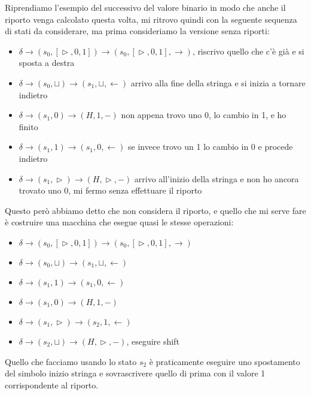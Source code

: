 Riprendiamo l'esempio del successivo del valore binario in modo che anche il riporto venga calcolato questa volta, mi ritrovo quindi con la seguente sequenza di stati da considerare, ma prima consideriamo la versione senza riporti:
\begin{itemize}
    \item $\delta\to(s_0,[\vartriangleright, 0,1])\to(s_0,[\vartriangleright, 0,1], \rightarrow)$, riscrivo quello che c'è già e si sposta a destra
    \item $\delta\to(s_0,\sqcup)\to(s_1,\sqcup,\leftarrow)$ arrivo alla fine della stringa e si inizia a tornare indietro
    \item $\delta\to(s_1,0)\to(H, 1, - )$ non appena trovo uno 0, lo cambio in 1, e ho finito
    \item $\delta\to(s_1,1)\to(s_1, 0, \leftarrow )$ se invece trovo un 1 lo cambio in 0 e procede indietro
    \item $\delta\to(s_1, \vartriangleright)\to(H, \vartriangleright, -)$ arrivo all'inizio della stringa e non ho ancora trovato uno 0, mi fermo senza effettuare il riporto
\end{itemize}
Questo però abbiamo detto che non considera il riporto, e quello che mi serve fare  è costruire una macchina che esegue quasi le stesse operazioni:
\begin{itemize}
    \item $\delta\to(s_0,[\vartriangleright, 0,1])\to(s_0,[\vartriangleright, 0,1], \rightarrow)$
    \item $\delta\to(s_0,\sqcup)\to(s_1,\sqcup,\leftarrow)$ 
    \item $\delta\to(s_1,1)\to(s_1, 0, \leftarrow )$ 
    \item $\delta\to(s_1,0)\to(H, 1, - )$ 
    \item $\delta\to(s_1, \vartriangleright)\to(s_2, 1, \leftarrow)$
    \item $\delta\to(s_2,\sqcup)\to(H, \vartriangleright, - )$, eseguire shift 
\end{itemize}
Quello che facciamo usando lo stato $s_2$ è praticamente eseguire uno spostamento del simbolo inizio stringa e sovrascrivere quello di prima con il valore 1 corrispondente al riporto. \\


